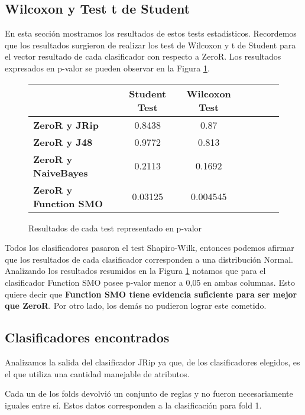 \subsection{Wilcoxon y Test t de Student}

En esta sección mostramos los resultados de estos tests estadísticos. Recordemos que los resultados surgieron de realizar los test de Wilcoxon y t de Student para el vector resultado de cada clasificador con respecto a ZeroR. Los resultados expresados en p-valor se pueden observar en la Figura \ref{res_tests_wilcoxon_student}.

\begin{figure}[H]
\begin{table}[H]
\centering
\begin{tabular}{|l|c|c|c|c|c|c|}
\hline
\textbf{}  & \textbf{Student Test} & \textbf{Wilcoxon Test} \\ \hline
\textbf{ZeroR y JRip}  & 0.8438 & 0.87 \\ \hline
\textbf{ZeroR y J48}  & 0.9772 & 0.813 \\ \hline
\textbf{ZeroR y NaiveBayes}  & 0.2113 & 0.1692 \\ \hline
\textbf{ZeroR y Function SMO}  & 0.03125 & 0.004545 \\ \hline
\end{tabular}
\end{table}
\caption{Resultados de cada test representado en p-valor}
\label{res_tests_wilcoxon_student}
\end{figure}

Todos los clasificadores pasaron el test Shapiro-Wilk, entonces podemos afirmar que los resultados de cada clasificador corresponden a una distribución Normal. Analizando los resultados resumidos en la Figura \ref{res_tests_wilcoxon_student} notamos que para el clasificador Function SMO posee p-valor menor a 0,05 en ambas columnas. Esto quiere decir que \textbf{Function SMO tiene evidencia suficiente para ser mejor que ZeroR}. Por otro lado, los demás no pudieron lograr este cometido. 

\subsection{Clasificadores encontrados}

Analizamos la salida del clasificador JRip ya que, de los clasificadores elegidos, es el que utiliza una cantidad manejable de atributos. 

Cada un de los folds devolvió un conjunto de reglas y no fueron necesariamente iguales entre sí. Estos datos corresponden a la clasificación para fold 1.

